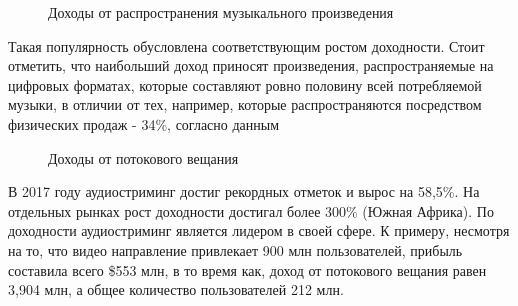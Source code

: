 \documentclass[12pt]{report}
\begin{document}
\def\Royalty{Авторские права}
\def\Digital{Цифровые форматы}
\def\Physical{Физические носители}
\def\Sync{Синхронизация}

\begin{figure}[h]
\centering
\caption{Доходы от распространения музыкального произведения}
\end{figure}

Такая популярность обусловлена соответствующим ростом доходности. Стоит отметить, что наибольший доход приносят произведения, распространяемые на цифровых форматах, которые составляют ровно половину всей потребляемой музыки, в отличии от тех, например, которые распространяются посредством  физических продаж - 34\%, согласно данным 

\begin{figure}[h]
\centering
\caption{Доходы от потокового вещания}
\vspace{20pt}
\streamingPartion
{}
\end{figure}

В 2017 году аудиостриминг достиг рекордных отметок и вырос на 58,5\%. На отдельных рынках рост доходности достигал более 300\% (Южная Африка).
По доходности аудиостриминг является лидером в своей сфере. К примеру, несмотря на то, что видео направление привлекает 900 млн пользователей, прибыль составила всего \$553 млн, в то время как, доход от потокового вещания равен 3,904 млн, а общее количество пользователей 212 млн.
\end{document}
